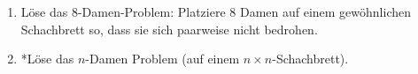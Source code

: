 \begin{aufg}
\begin{enumerate}
	\item Löse das $8$-Damen-Problem: Platziere $8$ Damen auf einem gewöhnlichen Schachbrett so, dass sie sich paarweise nicht bedrohen.
	\item *Löse das $n$-Damen Problem (auf einem $n \times n$-Schachbrett).
\end{enumerate}
\end{aufg}
